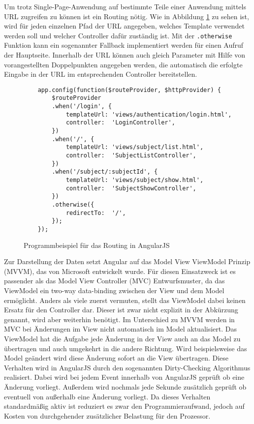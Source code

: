 Um trotz Single-Page-Anwendung auf bestimmte Teile einer Anwendung mittels URL zugreifen zu können ist ein Routing nötig.
Wie in Abbildung \ref{f:angularjs:routing} zu sehen ist, wird für jeden einzelnen Pfad der URL angegeben, welches Template verwendet werden soll und welcher Controller dafür zuständig ist.
Mit der \texttt{.otherwise} Funktion kann ein sogenannter Fallback implementiert werden für einen Aufruf der Hauptseite.
Innerhalb der URL können auch gleich Parameter mit Hilfe von vorangestellten Doppelpunkten angegeben werden, die automatisch die erfolgte Eingabe in der URL im entsprechenden Controller bereitstellen.

\begin{figure}[t]
	\centering
	\begin{lstlisting}
	app.config(function($routeProvider, $httpProvider) {
		$routeProvider
		.when('/login', {
			templateUrl: 'views/authentication/login.html',
			controller:  'LoginController',
		})
		.when('/', {
			templateUrl: 'views/subject/list.html',
			controller:  'SubjectListController',
		})
		.when('/subject/:subjectId', {
			templateUrl: 'views/subject/show.html',
			controller:  'SubjectShowController',
		})
		.otherwise({
			redirectTo:  '/',
		});		
	});
	\end{lstlisting}
	\caption{Programmbeispiel für das Routing in AngularJS}
	\label{f:angularjs:routing}
\end{figure}

Zur Darstellung der Daten setzt Angular auf das Model View ViewModel Prinzip (MVVM), das von Microsoft entwickelt wurde.
Für diesen Einsatzweck ist es passender als das Model View Controller (MVC) Entwurfsmuster, da das ViewModel ein two-way data-binding zwischen der View und dem Model ermöglicht.
Anders als viele zuerst vermuten, stellt das ViewModel dabei keinen Ersatz für den Controller dar.
Dieser ist zwar nicht explizit in der Abkürzung genannt, wird aber weiterhin benötigt.
Im Unterschied zu MVVM werden in MVC bei Änderungen im View nicht automatisch im Model aktualisiert.
Das ViewModel hat die Aufgabe jede Änderung in der View auch an das Model zu übertragen und auch umgekehrt in die andere Richtung.
Wird beispielsweise das Model geändert wird diese Änderung sofort an die View übertragen.
Diese Verhalten wird in AngularJS durch den sogenannten Dirty-Checking Algorithmus realisiert.
Dabei wird bei jedem Event innerhalb von AngularJS geprüft ob eine Änderung vorliegt.
Außerdem wird nochmals jede Sekunde zusätzlich geprüft ob eventuell von außerhalb eine Änderung vorliegt.
Da dieses Verhalten standardmäßig aktiv ist reduziert es zwar den Programmieraufwand, jedoch auf Kosten von durchgehender zusätzlicher Belastung für den Prozessor.

